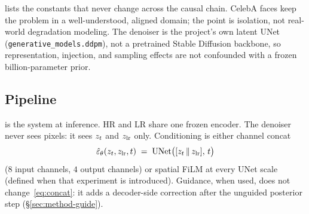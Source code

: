  lists the constants that never change across
the causal chain.
CelebA faces keep the problem in a well-understood, aligned domain;
the point is isolation, not real-world degradation modeling.
The denoiser is the project's own latent UNet
(\texttt{generative\_models.ddpm}), not a pretrained Stable Diffusion
backbone, so representation, injection, and sampling effects are not
confounded with a frozen billion-parameter prior.

\subsection{Pipeline}
\label{sec:pipeline}

 is the system at inference.
HR and LR share one frozen encoder.
The denoiser never sees pixels: it sees $z_{t}$ and $z_{\mathrm{lr}}$ only.
Conditioning is either channel concat
\begin{equation}
  \label{eq:concat}
  \hat{\varepsilon}_\theta(z_{t},z_{\mathrm{lr}},t)
  \;=\;
  \mathrm{UNet}\bigl([z_{t} \,\Vert\, z_{\mathrm{lr}}],\, t\bigr)
\end{equation}
($8$ input channels, $4$ output channels) or spatial FiLM at every
UNet scale (defined when that experiment is introduced).
Guidance, when used, does not change~\eqref{eq:concat}: it adds a
decoder-side correction after the unguided posterior step
(\S\ref{sec:method-guide}).

